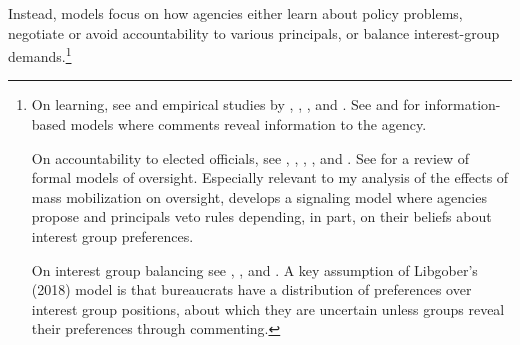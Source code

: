 Instead, models focus on how agencies either learn about policy problems, negotiate or avoid accountability to various principals, or balance interest-group demands.\footnote{
On learning, see \citet{Kerwin2011} and empirical studies by \citet{yackee2012}, \citet{Cook2017}, \citep{Gordon2018}, and \citet{Walters2019}. See \citet{Gailmard2017} and \citet{Libgober2018} for information-based models where comments reveal information to the agency. 

On accountability to elected officials, see  \citet{Furlong1997}, \citet{Nou2016}, \citet{Potter2016}, \citet{Woods2018}, and \citet{Yackee2009RegGov}. See \cite{Gailmard2012} for a review of formal models of oversight.
Especially relevant to my analysis of the effects of mass mobilization on oversight, \citet{Potter2014dis} develops a signaling model where agencies propose and principals veto rules depending, in part, on their beliefs about interest group preferences. 

On interest group balancing see \citet{Yackee2006JOP},  \citet{Yackee2006JPART}, and \citet{Kerwin2011}. A key assumption of Libgober's (2018) model is that bureaucrats have a distribution of preferences over interest group positions, about which they are uncertain unless groups reveal their preferences through commenting.
} 

